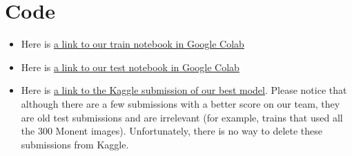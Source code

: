 \documentclass{article}
\begin{document}
\section{Code}
\begin{itemize}
    \item Here is \href{https://colab.research.google.com/drive/1O95T3f5k68-do9Ml-EqE1FKqu67zdDw1}{a link to our train notebook in Google Colab}
    \item Here is \href{https://colab.research.google.com/drive/1O95T3f5k68-do9Ml-EqE1FKqu67zdDw1}{a link to our test notebook in Google Colab}
    \item Here is \href{https://www.kaggle.com/code/itaysstorage/notebookaffcb41770?scriptVersionId=119540087}{a link to the Kaggle submission of our best model}. Please notice that although there are a few submissions with a better score on our team, they are old test submissions and are irrelevant (for example, trains that used all the 300 Monent images). Unfortunately, there is no way to delete these submissions from Kaggle.
\end{itemize}




\end{document}

